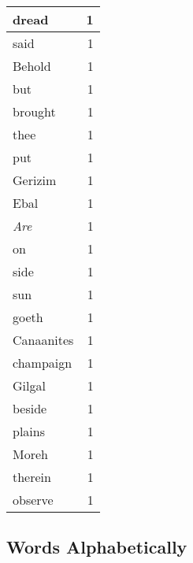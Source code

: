 \begin{center}
\begin{longtable}{l|r}
dread & 1 \\ \hline
said & 1 \\ \hline
Behold & 1 \\ \hline
but & 1 \\ \hline
brought & 1 \\ \hline
thee & 1 \\ \hline
put & 1 \\ \hline
Gerizim & 1 \\ \hline
Ebal & 1 \\ \hline
\emph{Are} & 1 \\ \hline
on & 1 \\ \hline
side & 1 \\ \hline
sun & 1 \\ \hline
goeth & 1 \\ \hline
Canaanites & 1 \\ \hline
champaign & 1 \\ \hline
Gilgal & 1 \\ \hline
beside & 1 \\ \hline
plains & 1 \\ \hline
Moreh & 1 \\ \hline
therein & 1 \\ \hline
observe & 1 \\ \hline
\end{longtable}
\end{center}



\normalsize



\subsection{Words Alphabetically}

